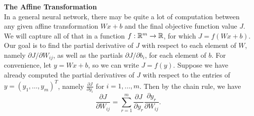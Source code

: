 \documentclass{article}
\newcommand{\nyuparagraph}[1]{\vspace{0.3cm}\textcolor{nyupurple}{\bf \large #1}\\}
\theoremstyle{plain}
\theoremstyle{definition}
\begin{document}
\nyuparagraph{The Affine Transformation}

In a general neural network, there may be quite a lot of computation
between any given affine transformation $Wx+b$ and the final objective
function value $J$. We will capture all of that in a function $f:\mathbb{R}^{m}\to\mathbb{R}$,
for which $J=f(Wx+b)$. Our goal is to find the partial derivative
of $J$ with respect to each element of $W$, namely $\partial J/\partial W_{ij}$,
as well as the partials $\partial J/\partial b_{i}$, for each element
of $b$. For convenience, let $y=Wx+b$, so we can write $J=f(y)$.
Suppose we have already computed the partial derivatives of $J$ with
respect to the entries of $y=\left(y_{1},\ldots,y_{m}\right)^{T}$,
namely $\frac{\partial J}{\partial y_{i}}$ for $i=1,\ldots,m$. Then
by the chain rule, we have
\[
\frac{\partial J}{\partial W_{ij}}=\sum_{r=1}^{m}\frac{\partial J}{\partial y_{r}}\frac{\partial y_{r}}{\partial W_{ij}}.
\]
\end{document}
